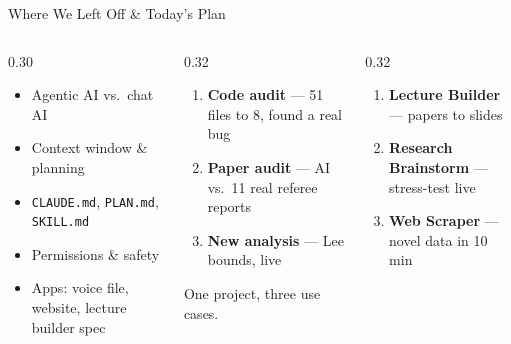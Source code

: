 \documentclass[aspectratio=169, 10pt]{beamer}
\begin{document}
\begin{frame}{Where We Left Off \& Today's Plan}
\begin{columns}[T]
\begin{column}{0.30\textwidth}
\begin{tcolorbox}[keybox, title={\faHistory\quad Session 1}]
\scriptsize
\begin{itemize}\setlength{\itemsep}{2pt}
  \item Agentic AI vs.\ chat AI
  \item Context window \& planning
  \item \texttt{CLAUDE.md}, \texttt{PLAN.md}, \texttt{SKILL.md}
  \item Permissions \& safety
  \item Apps: voice file, website, lecture builder spec
\end{itemize}
\end{tcolorbox}
\end{column}
\begin{column}{0.32\textwidth}
\begin{tcolorbox}[keybox, title={\faFlask\quad Emily: Research}]
\scriptsize
\begin{enumerate}\setlength{\itemsep}{2pt}
  \item \textbf{Code audit} --- 51 files to 8, found a real bug
  \item \textbf{Paper audit} --- AI vs.\ 11 real referee reports
  \item \textbf{New analysis} --- Lee bounds, live
\end{enumerate}
\vskip3pt
{\tiny\color{CoolGray} One project, three use cases.}
\end{tcolorbox}
\end{column}
\begin{column}{0.32\textwidth}
\begin{tcolorbox}[keybox, title={\faRocket\quad Erkmen: Teaching}]
\scriptsize
\begin{enumerate}\setlength{\itemsep}{2pt}
  \item \textbf{Lecture Builder} --- papers to slides
  \item \textbf{Research Brainstorm} --- stress-test live
  \item \textbf{Web Scraper} --- novel data in 10 min
\end{enumerate}
\end{tcolorbox}
\end{column}
\end{columns}
\end{frame}
\end{document}
